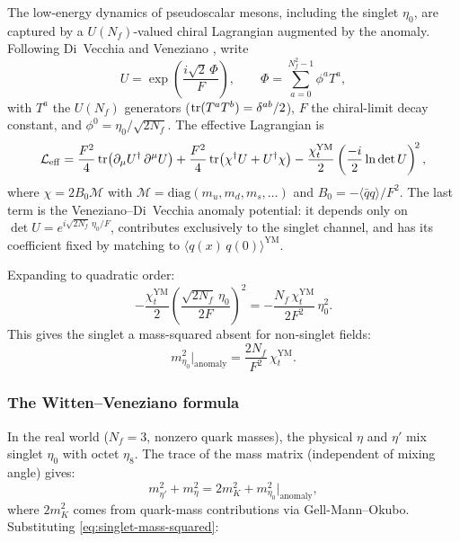 The low-energy dynamics of pseudoscalar mesons, including the singlet $\eta_0$, are captured by a $U(N_f)$-valued chiral Lagrangian augmented by the anomaly.  Following Di~Vecchia and Veneziano \cite{DiVecchiaVeneziano1980ChiralDynamics}, write
\begin{equation}\label{eq:U-field}
  U = \exp\!\left(\frac{i\sqrt{2}\,\Phi}{F}\right), \qquad
  \Phi = \sum_{a=0}^{N_f^2-1} \phi^a T^a,
\end{equation}
with $T^a$ the $U(N_f)$ generators ($\operatorname{tr}(T^a T^b)=\delta^{ab}/2$), $F$ the chiral-limit decay constant, and $\phi^0 = \eta_0/\sqrt{2N_f}$.  The effective Lagrangian is
\begin{equation}\label{eq:effective-lagrangian-anomaly}
  \mathcal{L}_{\mathrm{eff}} = \frac{F^2}{4}\operatorname{tr}\!\left(\partial_\mu U^\dagger\,\partial^\mu U\right)
  + \frac{F^2}{4}\operatorname{tr}\!\left(\chi^\dagger U + U^\dagger \chi\right)
  - \frac{\chi_t^{\mathrm{YM}}}{2}\left(\frac{-i}{2}\ln\det U\right)^{\!2},
\end{equation}
where $\chi = 2B_0 \mathcal{M}$ with $\mathcal{M} = \mathrm{diag}(m_u, m_d, m_s,\ldots)$ and $B_0 = -\langle\bar{q}q\rangle/F^2$.  The last term is the Veneziano--Di~Vecchia anomaly potential: it depends only on $\det U = e^{i\sqrt{2N_f}\,\eta_0/F}$, contributes exclusively to the singlet channel, and has its coefficient fixed by matching to $\langle q(x)\,q(0)\rangle^{\mathrm{YM}}$.

Expanding to quadratic order:
\begin{equation}\label{eq:anomaly-mass-contribution}
  -\frac{\chi_t^{\mathrm{YM}}}{2}\left(\frac{\sqrt{2N_f}\,\eta_0}{2F}\right)^{\!2}
  = -\frac{N_f\,\chi_t^{\mathrm{YM}}}{2F^2}\,\eta_0^2.
\end{equation}
This gives the singlet a mass-squared absent for non-singlet fields:
\begin{equation}\label{eq:singlet-mass-squared}
  m_{\eta_0}^2\big|_{\mathrm{anomaly}} = \frac{2N_f}{F^2}\,\chi_t^{\mathrm{YM}}.
\end{equation}

\subsubsection{The Witten--Veneziano formula}

In the real world ($N_f = 3$, nonzero quark masses), the physical $\eta$ and $\eta'$ mix singlet $\eta_0$ with octet $\eta_8$.  The trace of the mass matrix (independent of mixing angle) gives:
\begin{equation}\label{eq:mass-trace}
  m_{\eta'}^2 + m_\eta^2 = 2m_K^2 + m_{\eta_0}^2\big|_{\mathrm{anomaly}},
\end{equation}
where $2m_K^2$ comes from quark-mass contributions via Gell-Mann--Okubo.  Substituting \eqref{eq:singlet-mass-squared}:

